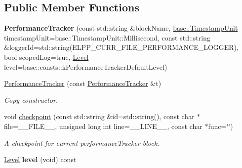 \subsection*{Public Member Functions}
\begin{DoxyCompactItemize}
\item 
{\bfseries Performance\+Tracker} (const std\+::string \&block\+Name, \hyperlink{namespaceel_1_1base_a1b886858c6409097395b24b1bdf03c39}{base\+::\+Timestamp\+Unit} timestamp\+Unit=base\+::\+Timestamp\+Unit\+::\+Millisecond, const std\+::string \&logger\+Id=std\+::string(E\+L\+P\+P\+\_\+\+C\+U\+R\+R\+\_\+\+F\+I\+L\+E\+\_\+\+P\+E\+R\+F\+O\+R\+M\+A\+N\+C\+E\+\_\+\+L\+O\+G\+G\+ER), bool scoped\+Log=true, \hyperlink{namespaceel_ab0ac6091262344c52dd2d3ad099e8e36}{Level} level=base\+::consts\+::k\+Performance\+Tracker\+Default\+Level)\hypertarget{classel_1_1base_1_1PerformanceTracker_a46ac6a851c6d1cde6742a7ebfeedd1b6}{}\label{classel_1_1base_1_1PerformanceTracker_a46ac6a851c6d1cde6742a7ebfeedd1b6}

\item 
\hyperlink{classel_1_1base_1_1PerformanceTracker_a49e655c1f414f904b2d6a9abb0d344f4}{Performance\+Tracker} (const \hyperlink{classel_1_1base_1_1PerformanceTracker}{Performance\+Tracker} \&t)\hypertarget{classel_1_1base_1_1PerformanceTracker_a49e655c1f414f904b2d6a9abb0d344f4}{}\label{classel_1_1base_1_1PerformanceTracker_a49e655c1f414f904b2d6a9abb0d344f4}

\begin{DoxyCompactList}\small\item\em Copy constructor. \end{DoxyCompactList}\item 
void \hyperlink{classel_1_1base_1_1PerformanceTracker_aec9a6e149674c5782cc855e49aeb0aaf}{checkpoint} (const std\+::string \&id=std\+::string(), const char $\ast$file=\+\_\+\+\_\+\+F\+I\+L\+E\+\_\+\+\_\+, unsigned long int line=\+\_\+\+\_\+\+L\+I\+N\+E\+\_\+\+\_\+, const char $\ast$func=\char`\"{}\char`\"{})\hypertarget{classel_1_1base_1_1PerformanceTracker_aec9a6e149674c5782cc855e49aeb0aaf}{}\label{classel_1_1base_1_1PerformanceTracker_aec9a6e149674c5782cc855e49aeb0aaf}

\begin{DoxyCompactList}\small\item\em A checkpoint for current performance\+Tracker block. \end{DoxyCompactList}\item 
\hyperlink{namespaceel_ab0ac6091262344c52dd2d3ad099e8e36}{Level} {\bfseries level} (void) const \hypertarget{classel_1_1base_1_1PerformanceTracker_a3e0ebd666cc7416dc9b818418266161b}{}\label{classel_1_1base_1_1PerformanceTracker_a3e0ebd666cc7416dc9b818418266161b}

\end{DoxyCompactItemize}
